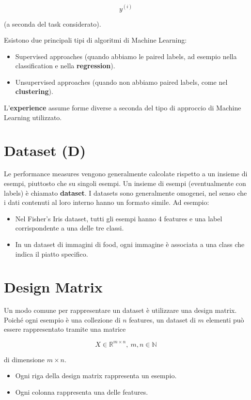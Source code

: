 \[ y^{(i)} \]

\noindent
(a seconda del task considerato).

\noindent
Esistono due principali tipi di algoritmi di Machine Learning:

\begin{itemize}
\item Supervised approaches (quando abbiamo le paired labels, ad esempio nella classification e nella \textbf{regression}).
\item Unsupervised approaches (quando non abbiamo paired labels, come nel \textbf{clustering}).
\end{itemize}

\noindent
L'\textbf{experience} assume forme diverse a seconda del tipo di approccio di Machine Learning utilizzato.

\section{Dataset (D)}

Le performance measures vengono generalmente calcolate rispetto a un insieme di esempi, piuttosto che su singoli esempi. Un insieme di esempi (eventualmente con labels) è chiamato \textbf{dataset}. I datasets sono generalmente omogenei, nel senso che i dati contenuti al loro interno hanno un formato simile. Ad esempio:

\begin{itemize}
    \item Nel Fisher’s Iris dataset, tutti gli esempi hanno 4 features e una label corrispondente a una delle tre classi.
    \item In un dataset di immagini di food, ogni immagine è associata a una class che indica il piatto specifico.
\end{itemize}

\section{Design Matrix}

Un modo comune per rappresentare un dataset è utilizzare una design matrix. Poiché ogni esempio è una collezione di $n$ features, un dataset di $m$ elementi può essere rappresentato tramite una matrice

$$
X \in \mathbb{R}^{m \times n}, \ m, n \in \mathbb{N}
$$

\noindent
di dimensione $m \times n$.

\begin{itemize}
    \item Ogni riga della design matrix rappresenta un esempio.
    \item Ogni colonna rappresenta una delle features.
\end{itemize}

